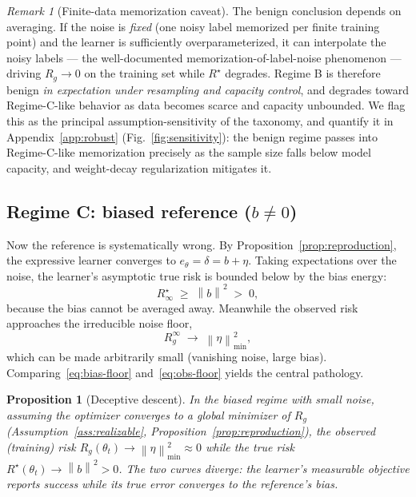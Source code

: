 \documentclass[10pt]{article} %
\theoremstyle{plain}
\newtheorem{proposition}{Proposition}
\theoremstyle{remark}
\newtheorem{remark}{Remark}
\newcommand{\norm}[1]{\left\lVert #1 \right\rVert}
\begin{document}
\begin{remark}[Finite-data memorization caveat]
The benign conclusion depends on averaging. If the noise is \emph{fixed} (one noisy label memorized per finite training point) and the learner is sufficiently overparameterized, it can interpolate the noisy labels --- the well-documented memorization-of-label-noise phenomenon --- driving $R_g\to 0$ on the training set while $R^\star$ degrades. Regime B is therefore benign \emph{in expectation under resampling and capacity control}, and degrades toward Regime-C-like behavior as data becomes scarce and capacity unbounded. We flag this as the principal assumption-sensitivity of the taxonomy, and quantify it in Appendix~\ref{app:robust} (Fig.~\ref{fig:sensitivity}): the benign regime passes into Regime-C-like memorization precisely as the sample size falls below model capacity, and weight-decay regularization mitigates it.
\end{remark}

\subsection{Regime C: biased reference ($b\neq 0$)}
\label{sec:regimeC}
Now the reference is systematically wrong. By Proposition~\ref{prop:reproduction}, the expressive learner converges to $e_\theta = \delta = b + \eta$. Taking expectations over the noise, the learner's asymptotic true risk is bounded below by the bias energy:
\begin{equation}
R^\star_\infty \;\ge\; \norm{b}^2 \;>\; 0,
\label{eq:bias-floor}
\end{equation}
because the bias cannot be averaged away. Meanwhile the observed risk approaches the irreducible noise floor,
\begin{equation}
R_g^\infty \;\to\; \norm{\eta}^2_{\min},
\label{eq:obs-floor}
\end{equation}
which can be made arbitrarily small (vanishing noise, large bias). Comparing~\eqref{eq:bias-floor} and~\eqref{eq:obs-floor} yields the central pathology.

\begin{proposition}[Deceptive descent]
\label{prop:deceptive}
In the biased regime with small noise, assuming the optimizer converges to a global minimizer of $R_g$ (Assumption~\ref{ass:realizable}, Proposition~\ref{prop:reproduction}), the observed (training) risk $R_g(\theta_t) \to \norm{\eta}^2_{\min}\approx 0$ while the true risk $R^\star(\theta_t) \to \norm{b}^2 > 0$. The two curves diverge: the learner's measurable objective reports success while its true error converges to the reference's bias.
\end{proposition}
\end{document}
